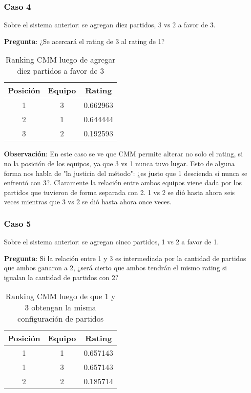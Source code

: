 \newpage

\subsubsection*{Caso 4}

Sobre el sistema anterior: se agregan diez partidos, 3 vs 2 a favor de 3.

\textbf{Pregunta}: ¿Se acercará el rating de 3 al rating de 1?

\begin{table}[h!]
    \begin{center}
        \begin{tabular}{|c|c|c|}
        \hline
        \textbf{Posición} & \textbf{Equipo} & \textbf{Rating} \\
        \hline
        1 & 3 & 0.662963\\
        2 & 1 & 0.644444\\
        3 & 2 & 0.192593\\
        \hline
        \end{tabular}
        \caption{Ranking CMM luego de agregar diez partidos a favor de 3}
        \label{cmm_caso_4}
    \end{center}
\end{table}

\textbf{Observación}: En este caso se ve que CMM permite alterar no solo el rating, si no la posición de los equipos, ya que 3 vs 1 nunca tuvo lugar. Esto de alguna forma nos habla de "la justicia del método": ¿es justo que 1 descienda si nunca se enfrentó con 3?. Claramente la relación entre ambos equipos viene dada por los partidos que tuvieron de forma separada con 2. 1 vs 2 se dió hasta ahora seis veces mientras que 3 vs 2 se dió hasta ahora once veces.

\subsubsection*{Caso 5}

Sobre el sistema anterior: se agregan cinco partidos, 1 vs 2 a favor de 1.

\textbf{Pregunta}: Si la relación entre 1 y 3 es intermediada por la cantidad de partidos que ambos ganaron a 2, ¿será cierto que ambos tendrán el mismo rating si igualan la cantidad de partidos con 2?

\begin{table}[h!]
    \begin{center}
        \begin{tabular}{|c|c|c|}
        \hline
        \textbf{Posición} & \textbf{Equipo} & \textbf{Rating} \\
        \hline
        1 & 1 & 0.657143\\
        1 & 3 & 0.657143\\
        2 & 2 & 0.185714\\
        \hline
        \end{tabular}
        \caption{Ranking CMM luego de que 1 y 3 obtengan la misma configuración de partidos}
        \label{cmm_caso_5}
    \end{center}
\end{table}


